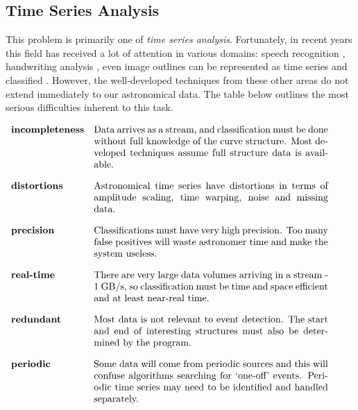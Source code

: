 	\subsection{Time Series Analysis}
	This problem is primarily one of \emph{time series analysis}. Fortunately, in recent years this field has received a lot of attention in various domains: speech recognition \citep{sakoe1978dynamic}, handwriting analysis \citep{bahlmann2002online}, even image outlines can be represented as time series and classified \citep{ye2009time}. However, the well-developed techniques from these other areas do not extend immediately to our astronomical data. The table below outlines the most serious difficulties inherent to this task.
	\vspace{10pt}
	\begin{table}[h!]

	\centering
	$\begin{array}{lp{0.7\textwidth}}
		\textbf{incompleteness} & Data arrives as a stream, and classification must be done without full knowledge of the curve structure. Most developed techniques assume full structure data is available. \vspace{10pt} \\
		\textbf{distortions} & Astronomical time series have distortions in terms of amplitude scaling, time warping, noise and missing data. \vspace{10pt} \\
		\textbf{precision} & Classifications must have very high precision. Too many false positives will waste astronomer time and make the system useless. \vspace{10pt} \\
		\textbf{real-time} & There are very large data volumes arriving in a stream - 1 GB/s, so classification must be time and space efficient and at least near-real time. \vspace{10pt} \\ 
		\textbf{redundant} & Most data is not relevant to event detection. The start and end of interesting structures must also be determined by the program. \vspace{10pt} \\
		\textbf{periodic} & Some data will come from periodic sources and this will confuse algorithms searching for `one-off' events. Periodic time series may need to be identified and handled separately.
	\end{array}$
	\end{table}
	
